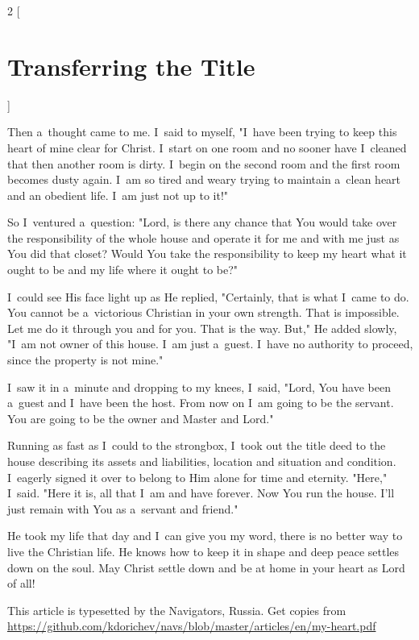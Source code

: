 \documentclass[a4paper,12pt]{article}
\begin{document}
\begin{multicols}{2}
    [
\section*{Transferring the Title}
    ]

Then a~thought came to me. I~said to myself, "I~have been trying to keep this heart of mine clear for Christ. I~start on one room and no sooner have I~cleaned that then another room is dirty. I~begin on the second room and the first room becomes dusty again. I~am so tired and weary trying to maintain a~clean heart and an obedient life. I~am just not up to it!" 

So I~ventured a~question: "Lord, is there any chance that You would take over the responsibility of the whole house and operate it for me and with me just as You did that closet? Would You take the responsibility to keep my heart what it ought to be and my life where it ought to be?" 

I~could see His face light up as He replied, "Certainly, that is what I~came to do. You cannot be a~victorious Christian in your own strength. That is impossible. Let me do it through you and for you. That is the way. But," He added slowly, "I~am not owner of this house. I~am just a~guest. I~have no authority to proceed, since the property is not mine." 

I~saw it in a~minute and dropping to my knees, I~said, "Lord, You have been a~guest and I~have been the host. From now on I~am going to be the servant. You are going to be the owner and Master and Lord." 

Running as fast as I~could to the strongbox, I~took out the title deed to the house describing its assets and liabilities, location and situation and condition. I~eagerly signed it over to belong to Him alone for time and eternity. "Here," I~said. "Here it is, all that I~am and have forever. Now You run the house. I'll just remain with You as a~servant and friend." 

He took my life that day and I~can give you my word, there is no better way to live the Christian life. He knows how to keep it in shape and deep peace settles down on the soul. May Christ settle down and be at home in your heart as Lord of all! 
\end{multicols}

\vfill
\noindent
{\tiny This article is typesetted by the Navigators, Russia. Get copies from \url{https://github.com/kdorichev/navs/blob/master/articles/en/my-heart.pdf}
}
\end{document}
